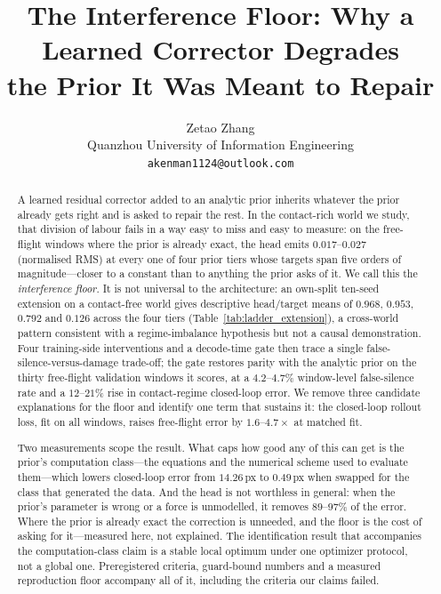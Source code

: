 \documentclass{article}
\title{The Interference Floor: Why a Learned Corrector Degrades\\ the Prior It Was Meant to Repair}
\author{Zetao Zhang\\ Quanzhou University of Information Engineering\\ \texttt{akenman1124@outlook.com}}
\begin{document}
\maketitle

\begin{abstract}
A learned residual corrector added to an analytic prior inherits whatever the prior
already gets right and is asked to repair the rest. In the contact-rich world we study,
that division of labour fails in a way easy to miss and easy to measure: on the
free-flight windows where the prior is already exact, the head emits $0.017$--$0.027$
(normalised RMS) at every one of four prior tiers whose targets span five orders of
magnitude---closer to a constant than to anything the prior asks of it. We call this
the \emph{interference floor}. It is not universal to the architecture: an own-split
ten-seed extension on a contact-free world gives descriptive head/target means of
$0.968$, $0.953$, $0.792$ and $0.126$ across the four tiers (Table~\ref{tab:ladder_extension}),
a cross-world pattern consistent with a regime-imbalance hypothesis but not a causal
demonstration. Four training-side interventions and a decode-time gate then trace a
single false-silence-versus-damage trade-off; the gate restores parity with the
analytic prior on the thirty free-flight validation windows it scores, at a
$4.2$--$4.7\%$ window-level false-silence rate and a $12$--$21\%$ rise in
contact-regime closed-loop error. We remove three candidate explanations for the floor
and identify one term that sustains it: the closed-loop rollout loss, fit on all
windows, raises free-flight error by $1.6$--$4.7\times$ at matched fit.

Two measurements scope the result. What caps how good any of this can get is the
prior's computation class---the equations and the numerical scheme used to evaluate
them---which lowers closed-loop error from $14.26$\,px to $0.49$\,px when swapped for
the class that generated the data. And the head is not worthless in general: when the
prior's parameter is wrong or a force is unmodelled, it removes $89$--$97\%$ of the
error. Where the prior is already exact the correction is unneeded, and the floor is
the cost of asking for it---measured here, not explained. The identification result
that accompanies the computation-class claim is a stable local optimum under one
optimizer protocol, not a global one. Preregistered criteria, guard-bound numbers and a
measured reproduction floor accompany all of it, including the criteria our claims
failed.
\end{abstract}
\end{document}

